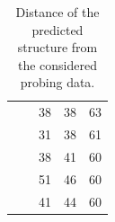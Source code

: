 \documentclass[11pt]{article} %
\begin{document}
\begin{table}[H]
{\begin{tabular}{llHHS}
	 & \DMSMg             & 38                            & 38                        & 63                    \\
	 & \NMIACE            & 31                            & 38                        & 61                    \\
	 & \OneMSevCE         & 38                            & 41                        & 60                    \\
	 & \BzCN              & 51                            & 46                        & 60                    \\
	 & \NAICE             & 41                            & 44                        & 60                    \\ \bottomrule
\end{tabular}\\}
\caption{Distance of the predicted structure from the considered probing data.}
\end{table}
\end{document}

